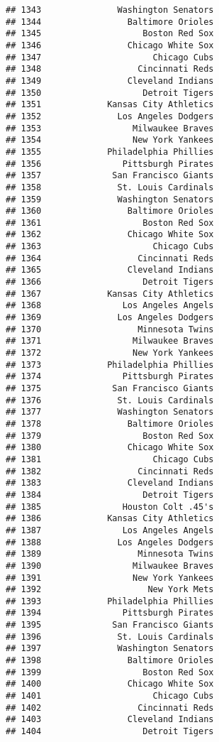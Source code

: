 \documentclass[]{article}
\begin{document}
\begin{verbatim}
## 1343               Washington Senators
## 1344                 Baltimore Orioles
## 1345                    Boston Red Sox
## 1346                 Chicago White Sox
## 1347                      Chicago Cubs
## 1348                   Cincinnati Reds
## 1349                 Cleveland Indians
## 1350                    Detroit Tigers
## 1351             Kansas City Athletics
## 1352               Los Angeles Dodgers
## 1353                  Milwaukee Braves
## 1354                  New York Yankees
## 1355             Philadelphia Phillies
## 1356                Pittsburgh Pirates
## 1357              San Francisco Giants
## 1358               St. Louis Cardinals
## 1359               Washington Senators
## 1360                 Baltimore Orioles
## 1361                    Boston Red Sox
## 1362                 Chicago White Sox
## 1363                      Chicago Cubs
## 1364                   Cincinnati Reds
## 1365                 Cleveland Indians
## 1366                    Detroit Tigers
## 1367             Kansas City Athletics
## 1368                Los Angeles Angels
## 1369               Los Angeles Dodgers
## 1370                   Minnesota Twins
## 1371                  Milwaukee Braves
## 1372                  New York Yankees
## 1373             Philadelphia Phillies
## 1374                Pittsburgh Pirates
## 1375              San Francisco Giants
## 1376               St. Louis Cardinals
## 1377               Washington Senators
## 1378                 Baltimore Orioles
## 1379                    Boston Red Sox
## 1380                 Chicago White Sox
## 1381                      Chicago Cubs
## 1382                   Cincinnati Reds
## 1383                 Cleveland Indians
## 1384                    Detroit Tigers
## 1385                Houston Colt .45's
## 1386             Kansas City Athletics
## 1387                Los Angeles Angels
## 1388               Los Angeles Dodgers
## 1389                   Minnesota Twins
## 1390                  Milwaukee Braves
## 1391                  New York Yankees
## 1392                     New York Mets
## 1393             Philadelphia Phillies
## 1394                Pittsburgh Pirates
## 1395              San Francisco Giants
## 1396               St. Louis Cardinals
## 1397               Washington Senators
## 1398                 Baltimore Orioles
## 1399                    Boston Red Sox
## 1400                 Chicago White Sox
## 1401                      Chicago Cubs
## 1402                   Cincinnati Reds
## 1403                 Cleveland Indians
## 1404                    Detroit Tigers

\end{verbatim}
\end{document}
